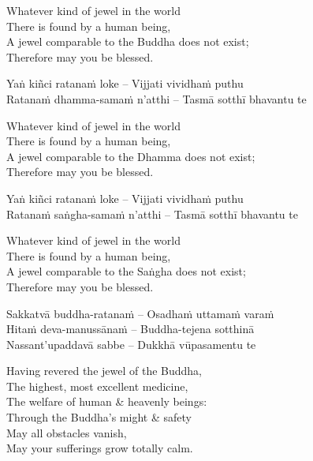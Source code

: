 \begin{english}
  Whatever kind of jewel in the world\\
  There is found by a human being,\\
  A jewel comparable to the Buddha does not exist;\\
  Therefore may you be blessed.
\end{english}

Yaṅ kiñci ratanaṁ loke – Vijjati vividhaṁ puthu\\
Ratanaṁ dhamma-samaṁ n'atthi – Tasmā sotthī bhavantu te

\begin{english}
  Whatever kind of jewel in the world\\
  There is found by a human being,\\
  A jewel comparable to the Dhamma does not exist;\\
  Therefore may you be blessed.
\end{english}

Yaṅ kiñci ratanaṁ loke – Vijjati vividhaṁ puthu\\
Ratanaṁ saṅgha-samaṁ n'atthi – Tasmā sotthī bhavantu te

\begin{english}
  Whatever kind of jewel in the world\\
  There is found by a human being,\\
  A jewel comparable to the Saṅgha does not exist;\\
  Therefore may you be blessed.
\end{english}

Sakkatvā buddha-ratanaṁ – Osadhaṁ
uttamaṁ varaṁ\\
Hitaṁ deva-manussānaṁ – Buddha-tejena sotthinā\\
Nassant'upaddavā sabbe – Dukkhā vūpasamentu te

\begin{english}
  Having revered the jewel of the Buddha,\\
  The highest, most excellent medicine,\\
  The welfare of human \& heavenly beings:\\
  Through the Buddha's might \& safety\\
  May all obstacles vanish,\\
  May your sufferings grow totally calm.
\end{english}

